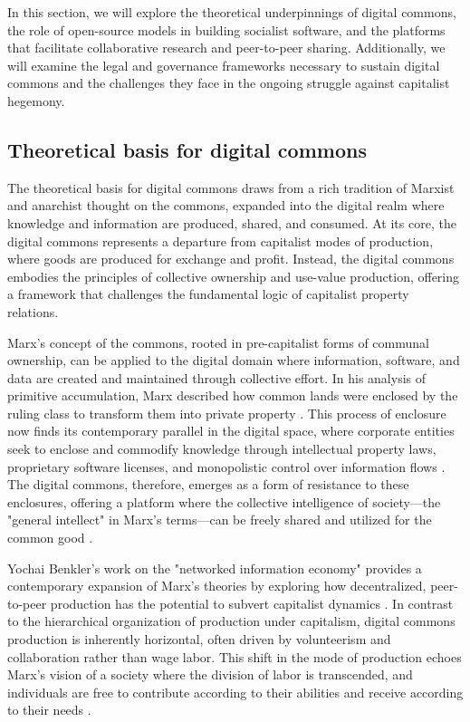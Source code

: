 \begin{refsection}
In this section, we will explore the theoretical underpinnings of digital commons, the role of open-source models in building socialist software, and the platforms that facilitate collaborative research and peer-to-peer sharing. Additionally, we will examine the legal and governance frameworks necessary to sustain digital commons and the challenges they face in the ongoing struggle against capitalist hegemony.

\subsection{Theoretical basis for digital commons}

The theoretical basis for digital commons draws from a rich tradition of Marxist and anarchist thought on the commons, expanded into the digital realm where knowledge and information are produced, shared, and consumed. At its core, the digital commons represents a departure from capitalist modes of production, where goods are produced for exchange and profit. Instead, the digital commons embodies the principles of collective ownership and use-value production, offering a framework that challenges the fundamental logic of capitalist property relations.

Marx's concept of the commons, rooted in pre-capitalist forms of communal ownership, can be applied to the digital domain where information, software, and data are created and maintained through collective effort. In his analysis of primitive accumulation, Marx described how common lands were enclosed by the ruling class to transform them into private property \cite[pp.~874-875]{marx2008}. This process of enclosure now finds its contemporary parallel in the digital space, where corporate entities seek to enclose and commodify knowledge through intellectual property laws, proprietary software licenses, and monopolistic control over information flows \cite[pp.~63-65]{bollier2016}. The digital commons, therefore, emerges as a form of resistance to these enclosures, offering a platform where the collective intelligence of society—the "general intellect" in Marx's terms—can be freely shared and utilized for the common good \cite[pp.~285-286]{hardt2005}.

Yochai Benkler’s work on the "networked information economy" provides a contemporary expansion of Marx’s theories by exploring how decentralized, peer-to-peer production has the potential to subvert capitalist dynamics \cite[pp.~31-34]{benkler2010}. In contrast to the hierarchical organization of production under capitalism, digital commons production is inherently horizontal, often driven by volunteerism and collaboration rather than wage labor. This shift in the mode of production echoes Marx's vision of a society where the division of labor is transcended, and individuals are free to contribute according to their abilities and receive according to their needs \cite[pp.~38-39]{marx2008}.


\end{refsection}
